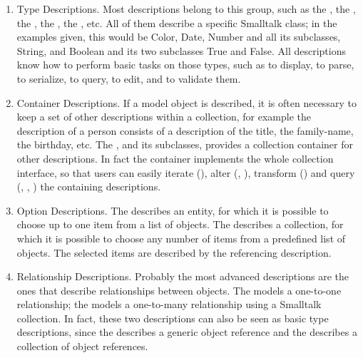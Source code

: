 \documentclass[a4paper,10pt,twoside]{book}
\begin{document}
\begin{enumerate}
\item{Type Descriptions.} Most descriptions belong to this group, such as the 
, the , the , the 
, the , etc. All of them describe a 
specific Smalltalk class; in the examples given, this would be Color, Date, 
Number and all its subclasses, String, and Boolean and its two subclasses 
True and False. All descriptions know how to perform basic tasks on those 
types, such as to display, to parse, to serialize, to query, to edit, and to 
validate them. 

\item{Container Descriptions.} If a model object is described, it is often necessary to keep a set of other descriptions within a collection, for example the description of a person consists of a description of the title, the family-name, the birthday, etc. The , and its subclasses, provides 
a collection container for other descriptions. In fact the container implements the whole collection interface, so that users can easily iterate (), alter (, ), transform () and query (, , ) the containing descriptions. 

\item{Option Descriptions.} The  describes an entity, for which it is possible to choose up to one item from a list of objects. The  describes a collection, for which it is possible to choose any number of items from a predefined list of objects. The 
selected items are described by the referencing description. 

\item{Relationship Descriptions.} Probably the most advanced descriptions 
are the ones that describe relationships between objects. The  models 
a one-to-one relationship; the  models a one-to-many relationship using a 
Smalltalk collection. In fact, these two descriptions can also be seen as basic type descriptions, 
since the  describes 
a generic object reference and the  describes a collection of object 
references. %
\end{enumerate}
\end{document}
